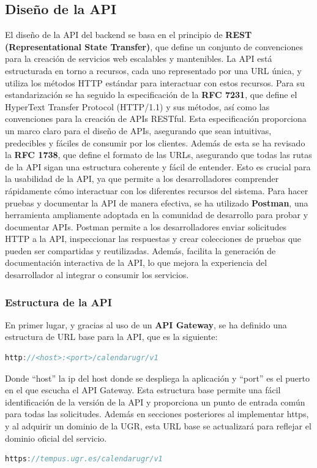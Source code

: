 \subsection{Diseño de la API}

El diseño de la API del backend se basa en el principio de \textbf{REST (Representational State Transfer)}, que define un conjunto de convenciones para la creación de servicios web escalables y mantenibles. La API está estructurada en torno a recursos, cada uno representado por una URL única, y utiliza los métodos HTTP estándar para interactuar con estos recursos.
\newline\newline
Para su estandarización se ha seguido la especificación de la \textbf{RFC 7231}\cite{rfc7231}, que define el HyperText Transfer Protocol (HTTP/1.1) y sus métodos, así como las convenciones para la creación de APIs RESTful. Esta especificación proporciona un marco claro para el diseño de APIs, asegurando que sean intuitivas, predecibles y fáciles de consumir por los clientes.
\newline
Además de esta se ha revisado la \textbf{RFC 1738}\cite{rfc1738}, que define el formato de las URLs, asegurando que todas las rutas de la API sigan una estructura coherente y fácil de entender. Esto es crucial para la usabilidad de la API, ya que permite a los desarrolladores comprender rápidamente cómo interactuar con los diferentes recursos del sistema.
\newline\newline
Para hacer pruebas y documentar la API de manera efectiva, se ha utilizado \textbf{Postman}, una herramienta ampliamente adoptada en la comunidad de desarrollo para probar y documentar APIs. Postman permite a los desarrolladores enviar solicitudes HTTP a la API, inspeccionar las respuestas y crear colecciones de pruebas que pueden ser compartidas y reutilizadas. Además, facilita la generación de documentación interactiva de la API, lo que mejora la experiencia del desarrollador al integrar o consumir los servicios.

\subsubsection{Estructura de la API}

En primer lugar, y gracias al uso de un \textbf{API Gateway}, se ha definido una estructura de URL base para la API, que es la siguiente:
\begin{lstlisting}[language=Java]
http://<host>:<port>/calendarugr/v1
\end{lstlisting}
Donde ``\<host\>'' la ip del host donde se despliega la aplicación y ``\<port\>'' es el puerto en el que escucha el API Gateway. Esta estructura base permite una fácil identificación de la versión de la API y proporciona un punto de entrada común para todas las solicitudes. Además en secciones posteriores al implementar https, y al adquirir un dominio de la UGR, esta URL base se actualizará para reflejar el dominio oficial del servicio.
\begin{lstlisting}[language=Java]
https://tempus.ugr.es/calendarugr/v1
\end{lstlisting}

